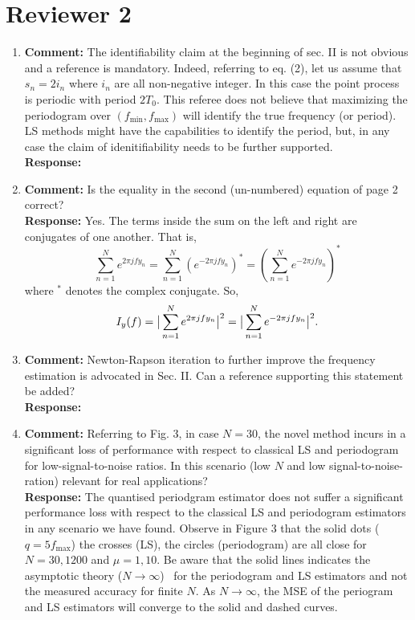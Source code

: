 \documentclass[a4paper,10pt]{article}
\begin{document}
\section*{Reviewer 2}


\begin{enumerate}

\item\textbf{Comment:}
 The identifiability claim at the beginning of sec. II is not obvious and a reference is mandatory. Indeed, referring to eq. (2), let us assume that $s_n = 2 i_n$ where $i_n$ are all non-negative integer. In this case the point process is periodic with period $2 T_0$. This referee does not believe that maximizing the periodogram over $(f_{\text{min}},f_{\text{max}})$ will identify the true frequency (or period). LS methods might have the capabilities to identify the period, but, in any case the claim of idenitifiability needs to be further supported.
\\
\textbf{Response:}


\item\textbf{Comment:}
Is the equality in the second (un-numbered) equation of page 2 correct?
\\
\textbf{Response:}
Yes.  The terms inside the sum on the left and right are conjugates of one another.  That is,
\[
\sum_{n=1}^N e^{ 2\pi j f y_n} = \sum_{n=1}^N (e^{-2\pi j f y_n})^* = \left( \sum_{n=1}^N e^{ -2\pi j f y_n} \right)^*
\]
where $^*$ denotes the complex conjugate.  So,
\[
I_y(f) = \big\vert  \sum_{n=1}^N e^{ 2\pi j f y_n}  \big\vert^2 = \big\vert  \sum_{n=1}^N e^{ -2\pi j f y_n}  \big\vert^2.
\]

\item\textbf{Comment:}
Newton-Rapson iteration to further improve the frequency estimation is advocated in Sec. II. Can a reference supporting this statement be added?
\\
\textbf{Response:}

\item\textbf{Comment:}
Referring to Fig. 3, in case $N=30$, the novel method incurs in a significant loss of performance with respect to classical LS and periodogram for low-signal-to-noise ratios. In this scenario (low $N$ and low signal-to-noise-ration) relevant for real applications?
\\
\textbf{Response:}
The quantised periodgram estimator does not suffer a significant performance loss with respect to the classical LS and periodogram estimators in any scenario we have found.  Observe in Figure 3 that the solid dots ($q=5 f_{\text{max}}$) the crosses (LS), the circles (periodogram) are all close for $N=30,1200$ and $\mu=1,10$.  Be aware that the solid lines indicates the asymptotic theory ($N\to\infty$)~\cite{Quinn_sparse_noisy_SSP_2012,Quinn20013asilomar_period_est} for the periodogram and LS estimators and not the measured accuracy for finite $N$.  As $N\to\infty$, the MSE of the periogram and LS estimators will converge to the solid and dashed curves.

\end{enumerate}



{\small

}
\end{document}
